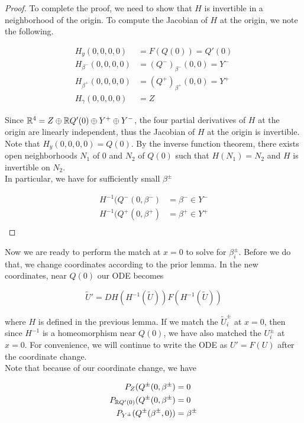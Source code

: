 \documentclass[thesis.tex]{subfiles}
\begin{document}
\begin{lemma}
\begin{proof}
To complete the proof, we need to show that $H$ is invertible in a neighborhood of the origin. To compute the Jacobian of $H$ at the origin, we note the following.

\begin{align*}
H_y(0, 0, 0, 0) &= F(Q(0)) = Q'(0) \\
H_{\beta^-}(0, 0, 0, 0) &= (Q^-)_{\beta^-}(0,0) = Y^- \\
H_{\beta^+}(0, 0, 0, 0) &= (Q^+)_{\beta^+}(0,0) = Y^+ \\
H_{\gamma}(0, 0, 0, 0) &= Z
\end{align*}

Since ${\mathbb R}^4 = Z \oplus {\mathbb R} Q'(0) \oplus Y^+ \oplus Y^-$, the four partial derivatives of $H$ at the origin are linearly independent, thus the Jacobian of $H$ at the origin is invertible. Note that $H_y(0, 0, 0, 0) = Q(0)$. By the inverse function theorem, there exists open neighborhoods $N_1$ of 0 and $N_2$ of $Q(0)$ such that $H(N_1) = N_2$ and $H$ is invertible on $N_2$. \\

In particular, we have for sufficiently small $\beta^\pm$

\begin{align*}
H^{-1}(Q^-(0, \beta^-) &= \beta^- \in Y^- \\
H^{-1}(Q^+(0, \beta^+) &= \beta^+ \in Y^+ \\
\end{align*}

\end{proof}
\end{lemma}

Now we are ready to perform the match at $x = 0$ to solve for $\beta_i^\pm$. Before we do that, we change coordinates according to the prior lemma. In the new coordinates, near $Q(0)$ our ODE becomes

\begin{equation}
\tilde{U}' = DH(H^{-1}(\tilde{U})) F( H^{-1}(\tilde{U}) )
\end{equation}

where $H$ is defined in the previous lemma. If we match the $\tilde{U}_i^\pm$ at $x = 0$, then since $H^{-1}$ is a homeomorphism near $Q(0)$, we have also matched the $U_i^\pm$ at $x = 0$. For convenience, we will continue to write the ODE as $U' = F(U)$ after the coordinate change.\\

Note that because of our coordinate change, we have

\begin{align*}
P_Z(Q^\pm(0, \beta^\pm) &= 0 \\
P_{{\mathbb R} Q'(0)}(Q^\pm(0, \beta^\pm) &= 0 \\
P_{Y^\pm}(Q^\pm(\beta^\pm, 0)) &= \beta^\pm
\end{align*}
\end{document}
